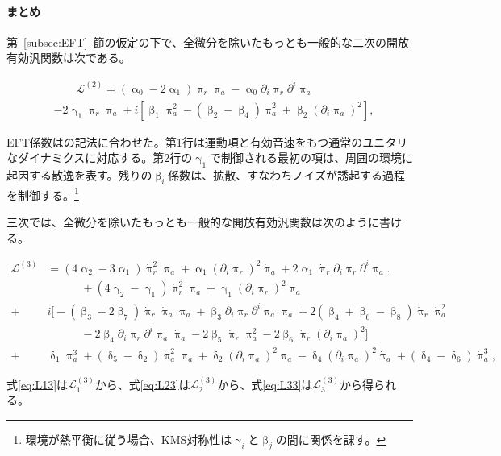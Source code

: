 \documentclass[a4paper,11pt]{ltjsarticle}
\numberwithin{equation}{section}
\newcommand{\Sec}[1]{Sec.~\ref{#1}}
\renewcommand{\Sec}[1]{第~\ref{#1}~節}
\begin{document}
\begin{tcolorbox}[enhanced,breakable,skin first=enhanced,skin middle=enhanced,skin last=enhanced,before upper={\parindent15pt},]{}
\paragraph{まとめ}

\Sec{subsec:EFT}の仮定の下で、全微分を除いたもっとも一般的な二次の開放有効汎関数は次である。

\begin{align}\label{eq:L2ref}
    &\qquad \mathcal{L}^{(2)} =\left( \upalpha_0 -2 \upalpha_1\right) \dot{\uppi}_{r} \dot{\uppi}_{a} - \upalpha_0 \partial_i \uppi_{r}  \partial^i \uppi_{a} \nonumber   \\
    &- 2 \upgamma_1  \dot{\uppi}_{r} \uppi_a+i \left[\upbeta_1 \uppi_a^2 - \left(\upbeta_2 - \upbeta_4\right)\dot{\uppi}_a^2 + \upbeta_2 \left(\partial_i \uppi_{a} \right)^2\right],
\end{align}

EFT係数は\cite{Hongo:2018ant}の記法に合わせた。第1行は運動項と有効音速をもつ通常のユニタリなダイナミクスに対応する。第2行の$\upgamma_1$で制御される最初の項は、周囲の環境に起因する散逸を表す。残りの$\upbeta_i$係数は、拡散、すなわちノイズが誘起する過程を制御する。\footnote{環境が熱平衡に従う場合、KMS対称性は$\upgamma_i$と$\upbeta_j$の間に関係を課す\cite{Liu:2018kfw}。}

三次では、全微分を除いたもっとも一般的な開放有効汎関数は次のように書ける。

\begin{align}
    \mathcal{L}^{(3)} &= \left(4 \upalpha_2 -3\upalpha_1 \right) \dot{\uppi}^2_{r} \dot{\uppi}_{a} + \upalpha_1 \left(\partial_i \uppi_{r} \right)^2 \dot{\uppi}_a + 2 \upalpha_1  \dot{\uppi}_{r}	\partial_i \uppi_{r}  \partial^i \uppi_{a} \Big. \label{eq:L13} \\
    &\qquad \quad + \left(4 \upgamma_2 -\upgamma_1 \right)  \dot{\uppi}^2_{r} \uppi_{a}	+ \upgamma_1 	\left(\partial_i \uppi_{r} \right)^2 \uppi_a \nonumber \\ 
    +&i \Big[-(\upbeta_3 -2 \upbeta_7)\dot{\uppi}_{r} \dot{\uppi}_{a} \uppi_a + \upbeta_3 \partial_i \uppi_{r}  \partial^i \uppi_{a} \uppi_a +2 (\upbeta_4+\upbeta_6 - \upbeta_8) \dot{\uppi}_{r} \dot{\uppi}_a^2 \label{eq:L23} \\
    & \qquad \quad - 2 \upbeta_4   \partial_i \uppi_{r}  \partial^i \uppi_{a} \dot{\uppi}_{a} - 2\upbeta_5 \dot{\uppi}_{r} \uppi_a^2  - 2 \upbeta_6 \dot{\uppi}_{r}(\partial_i\uppi_a)^2\Big] \nonumber \\
    +&\updelta_1 \uppi_a^3 + (\updelta_5- \updelta_2)  \dot{\uppi}_{a}^2 \uppi_a  + \updelta_2  (\partial_i \uppi_{a})^2 \uppi_a - \updelta_4  (\partial_i \uppi_{a})^2 \dot{\uppi}_a + (\updelta_4-\updelta_6)\dot{\uppi}_{a}^3, \label{eq:L33}
\end{align}

式\ref{eq:L13}は$\mathcal{L}_1^{(3)}$から、式\ref{eq:L23}は$\mathcal{L}_2^{(3)}$から、式\ref{eq:L33}は$\mathcal{L}_3^{(3)}$から得られる。

\end{tcolorbox}
\end{document}
